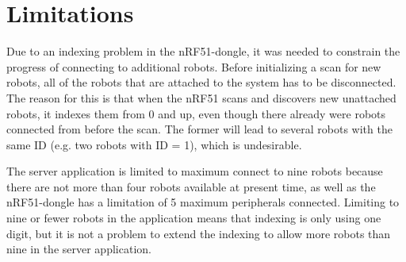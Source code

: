 \section{Limitations}
Due to an indexing problem in the nRF51-dongle, it was needed to constrain the progress of connecting to additional robots. Before initializing a scan for new robots, all of the robots that are attached to the system has to be disconnected. The reason for this is that when the nRF51 scans and discovers new unattached robots, it indexes them from 0 and up, even though there already were robots connected from before the scan. The former will lead to several robots with the same ID (e.g. two robots with ID = 1), which is undesirable.

The server application is limited to maximum connect to nine robots because there are not more than four robots available at present time, as well as the nRF51-dongle has a limitation of 5 maximum peripherals connected. Limiting to nine or fewer robots in the application means that indexing is only using one digit, but it is not a problem to extend the indexing to allow more robots than nine in the server application.